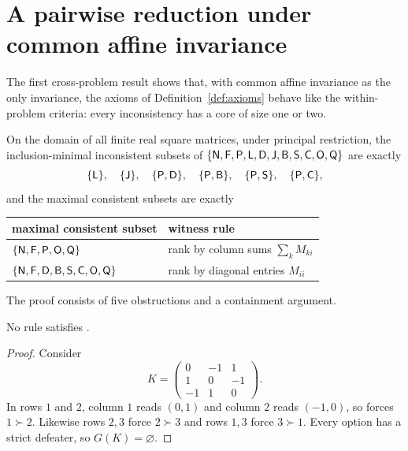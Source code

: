 \section{A pairwise reduction under common affine invariance}\label{sec:pairwise}

The first cross-problem result shows that, with common affine invariance as the only invariance,
the axioms of Definition~\ref{def:axioms} behave like the within-problem criteria: every inconsistency
has a core of size one or two.

\begin{theorem}\label{thm:pairwise}
On the domain of all finite real square matrices, under principal restriction, the
inclusion-minimal inconsistent subsets of
$\{\textup{\textsf{N}},\textup{\textsf{F}},\textup{\textsf{P}},\textup{\textsf{L}},\textup{\textsf{D}},\textup{\textsf{J}},\textup{\textsf{B}},\textup{\textsf{S}},\textup{\textsf{C}},\textup{\textsf{O}},\textup{\textsf{Q}}\}$ are exactly
\[
  \{\textup{\textsf{L}}\},\quad\{\textup{\textsf{J}}\},\quad\{\textup{\textsf{P}},\textup{\textsf{D}}\},\quad\{\textup{\textsf{P}},\textup{\textsf{B}}\},\quad
  \{\textup{\textsf{P}},\textup{\textsf{S}}\},\quad\{\textup{\textsf{P}},\textup{\textsf{C}}\},
\]
and the maximal consistent subsets are exactly
\begin{center}
\small
\begin{tabular}{@{}ll@{}}
  \toprule
  maximal consistent subset & witness rule \\
  \midrule
  $\{\textup{\textsf{N}},\textup{\textsf{F}},\textup{\textsf{P}},\textup{\textsf{O}},\textup{\textsf{Q}}\}$ & rank by column sums $\sum_kM_{ki}$ \\
  $\{\textup{\textsf{N}},\textup{\textsf{F}},\textup{\textsf{D}},\textup{\textsf{B}},\textup{\textsf{S}},\textup{\textsf{C}},\textup{\textsf{O}},\textup{\textsf{Q}}\}$ & rank by diagonal entries $M_{ii}$ \\
  \bottomrule
\end{tabular}
\end{center}
\end{theorem}

The proof consists of five obstructions and a containment argument.

\begin{proposition}\label{prop:L}
No rule satisfies .
\end{proposition}

\begin{proof}
Consider
\[
  K=\begin{pmatrix}0&-1&1\\1&0&-1\\-1&1&0\end{pmatrix}.
\]
In rows $1$ and $2$, column $1$ reads $(0,1)$ and column $2$ reads $(-1,0)$, so  forces $1\succ2$.
Likewise rows $2,3$ force $2\succ3$ and rows $1,3$ force $3\succ1$. Every option has a strict
defeater, so $G(K)=\varnothing$.
\end{proof}

